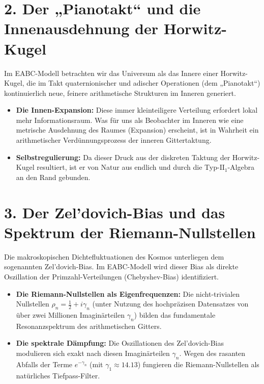 \documentclass[11pt,a4paper]{article}
\begin{document}
	\section{2. Der „Pianotakt“ und die Innenausdehnung der Horwitz-Kugel}
	Im EABC-Modell betrachten wir das Universum als das Innere einer Horwitz-Kugel, die im Takt quaternionischer und adischer Operationen (dem „Pianotakt“) kontinuierlich neue, feinere arithmetische Strukturen im Inneren generiert.
	\begin{itemize}
		\item \textbf{Die Innen-Expansion:} Diese immer kleinteiligere Verteilung erfordert lokal mehr Informationsraum. Was für uns als Beobachter im Inneren wie eine metrische Ausdehnung des Raumes (Expansion) erscheint, ist in Wahrheit ein arithmetischer Verdünnungsprozess der inneren Gittertaktung.
		\item \textbf{Selbstregulierung:} Da dieser Druck aus der diskreten Taktung der Horwitz-Kugel resultiert, ist er von Natur aus endlich und durch die Typ-$\text{II}_1$-Algebra an den Rand gebunden.
	\end{itemize}
	
	\section{3. Der Zel'dovich-Bias und das Spektrum der Riemann-Nullstellen}
	Die makroskopischen Dichtefluktuationen des Kosmos unterliegen dem sogenannten Zel'dovich-Bias. Im EABC-Modell wird dieser Bias als direkte Oszillation der Primzahl-Verteilungen (Chebyshev-Bias) identifiziert.
	\begin{itemize}
		\item \textbf{Die Riemann-Nullstellen als Eigenfrequenzen:} Die nicht-trivialen Nullstellen $\rho_n = \frac{1}{2} + i\gamma_n$ (unter Nutzung des hochpräzisen Datensatzes von über zwei Millionen Imaginärteilen $\gamma_n$) bilden das fundamentale Resonanzspektrum des arithmetischen Gitters.
		\item \textbf{Die spektrale Dämpfung:} Die Oszillationen des Zel'dovich-Bias modulieren sich exakt nach diesen Imaginärteilen $\gamma_n$. Wegen des rasanten Abfalls der Terme $e^{-\gamma_n}$ (mit $\gamma_1 \approx 14.13$) fungieren die Riemann-Nullstellen als natürliches Tiefpass-Filter.
	\end{itemize}
	
\end{document}
